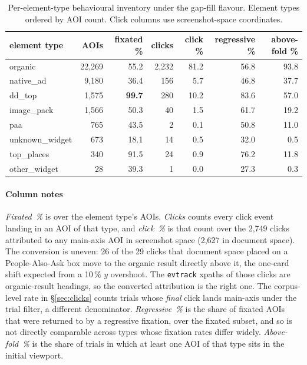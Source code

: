 \documentclass[sigconf,authorversion,natbib=true]{acmart}
\begin{document}
\begin{table}[t]
  \caption{Per-element-type behavioural inventory under the gap-fill flavour. Element types ordered by AOI count. Click columns use screenshot-space coordinates.}
  \label{tab:inventory}
  \small
  \begin{tabular}{lrrrrrr}
    \toprule
    element type & AOIs & fixated \% & clicks & click \% & regressive \% & above-fold \% \\
    \midrule
    organic         & 22,269 & 55.2          & 2,232 & 81.2 & 56.8 & 93.8 \\
    native\_ad      & 9,180  & 36.4          & 156   & 5.7  & 46.8 & 37.7 \\
    dd\_top         & 1,575  & \textbf{99.7} & 280   & 10.2 & 83.6 & 57.0 \\
    image\_pack     & 1,566  & 50.3          & 40    & 1.5  & 61.7 & 19.2 \\
    paa             & 765    & 43.5          & 2     & 0.1  & 50.8 & 11.0 \\
    unknown\_widget & 673    & 18.1          & 14    & 0.5  & 32.0 & 0.5  \\
    top\_places     & 340    & 91.5          & 24    & 0.9  & 76.2 & 11.8 \\
    other\_widget   & 28     & 39.3          & 1     & 0.0  & 27.3 & 0.3  \\
    \bottomrule
  \end{tabular}
\end{table}

\paragraph{Column notes} \emph{Fixated~\%} is over the element type's AOIs. \emph{Clicks} counts every click event landing in an AOI of that type, and \emph{click~\%} is that count over the 2,749 clicks attributed to any main-axis AOI in screenshot space (2,627 in document space). The conversion is uneven: 26 of the 29 clicks that document space placed on a People-Also-Ask box move to the organic result directly above it, the one-card shift expected from a 10\,\% $y$ overshoot. The \texttt{evtrack} xpaths of those clicks are organic-result headings, so the converted attribution is the right one. The corpus-level rate in \S\ref{sec:clicks} counts trials whose \emph{final} click lands main-axis under the trial filter, a different denominator. \emph{Regressive~\%} is the share of fixated AOIs that were returned to by a regressive fixation, over the fixated subset, and so is not directly comparable across types whose fixation rates differ widely. \emph{Above-fold~\%} is the share of trials in which at least one AOI of that type sits in the initial viewport.
\end{document}
